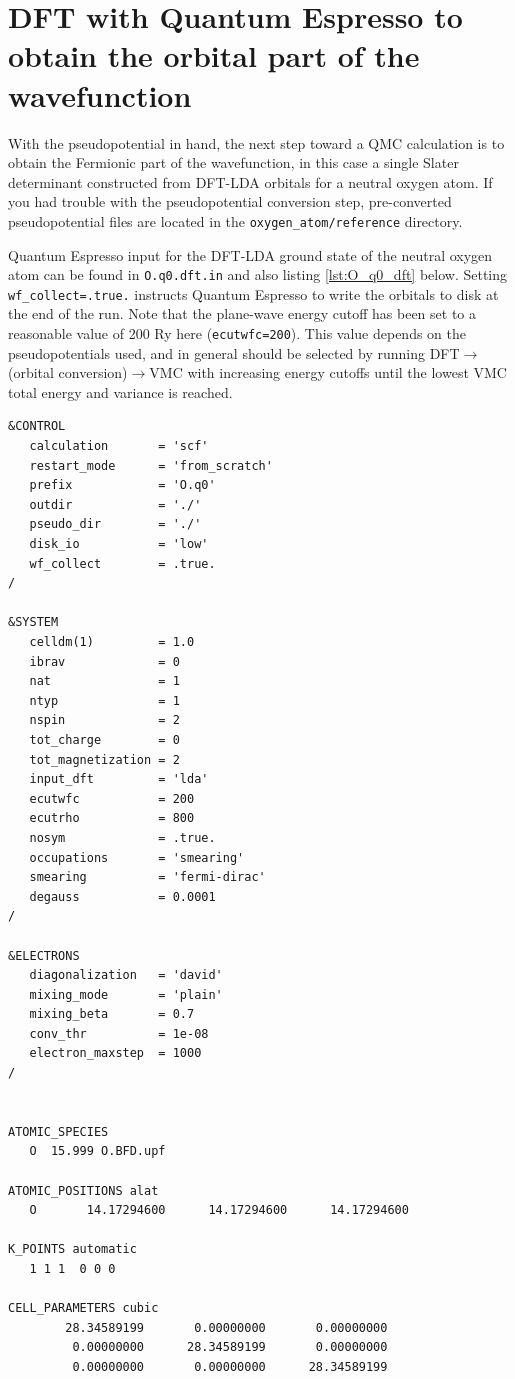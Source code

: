 \section{DFT with Quantum Espresso to obtain the orbital part of the wavefunction}
\label{sec:lqb_dft}
With the pseudopotential in hand, the next step toward a QMC calculation is to obtain the Fermionic part of the wavefunction, in this case a single Slater determinant constructed from DFT-LDA orbitals for a neutral oxygen atom.  If you had trouble with the pseudopotential conversion step, pre-converted pseudopotential files are located in the \texttt{oxygen\_atom/reference} directory.  

Quantum Espresso input for the DFT-LDA ground state of the neutral oxygen atom can be found in \texttt{O.q0.dft.in} and also listing \ref{lst:O_q0_dft} below.  Setting \texttt{wf\_collect=.true.} instructs Quantum Espresso to write the orbitals to disk at the end of the run.  Note that the plane-wave energy cutoff has been set to a reasonable value of 200 Ry here (\texttt{ecutwfc=200}).  This value depends on the pseudopotentials used, and in general should be selected by running DFT$\rightarrow$(orbital conversion)$\rightarrow$VMC with increasing energy cutoffs until the lowest VMC total energy and variance is reached.

\begin{lstlisting}[caption={Quantum Espresso input file for the neutral oxygen atom (\texttt{O.q0.dft.in})\label{lst:O_q0_dft}}]
&CONTROL
   calculation       = 'scf'
   restart_mode      = 'from_scratch'
   prefix            = 'O.q0'
   outdir            = './'
   pseudo_dir        = './'
   disk_io           = 'low'
   wf_collect        = .true.
/

&SYSTEM
   celldm(1)         = 1.0
   ibrav             = 0
   nat               = 1
   ntyp              = 1
   nspin             = 2
   tot_charge        = 0
   tot_magnetization = 2
   input_dft         = 'lda'
   ecutwfc           = 200
   ecutrho           = 800
   nosym             = .true.
   occupations       = 'smearing'
   smearing          = 'fermi-dirac'
   degauss           = 0.0001
/

&ELECTRONS
   diagonalization   = 'david'
   mixing_mode       = 'plain'
   mixing_beta       = 0.7
   conv_thr          = 1e-08
   electron_maxstep  = 1000
/


ATOMIC_SPECIES 
   O  15.999 O.BFD.upf

ATOMIC_POSITIONS alat
   O       14.17294600      14.17294600      14.17294600 

K_POINTS automatic
   1 1 1  0 0 0 

CELL_PARAMETERS cubic
        28.34589199       0.00000000       0.00000000 
         0.00000000      28.34589199       0.00000000 
         0.00000000       0.00000000      28.34589199 
\end{lstlisting}

